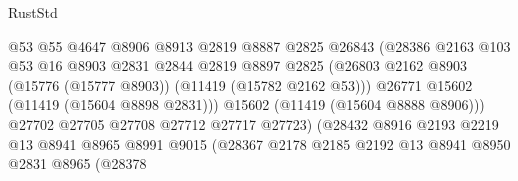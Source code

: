 \begin{lexlean}{RustStd}
\begin{coremodule}
                                        @53
                                        @55
                                        @4647
                                        @8906
                                        @8913
                                        @2819
                                        @8887
                                        @2825
                                        @26843
                                        (@28386
                                          @2163
                                          @103
                                          @53
                                          @16
                                          @8903
                                          @2831
                                          @2844
                                          @2819
                                          @8897
                                          @2825
                                          (@26803
                                            @2162
                                            @8903
                                            (@15776 (@15777 @8903))
                                            (@11419 (@15782 @2162 @53)))
                                          @26771
                                          @15602
                                          (@11419 (@15604 @8898 @2831)))
                                        @15602
                                        (@11419 (@15604 @8888 @8906)))
                                      @27702
                                      @27705
                                      @27708
                                      @27712
                                      @27717
                                      @27723)
                                    (@28432
                                      @8916
                                      @2193
                                      @2219
                                      @13
                                      @8941
                                      @8965
                                      @8991
                                      @9015
                                      (@28367
                                        @2178
                                        @2185
                                        @2192
                                        @13
                                        @8941
                                        @8950
                                        @2831
                                        @8965
                                        (@28378

\end{coremodule}
\end{lexlean}
